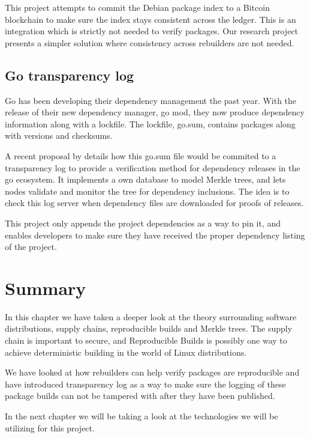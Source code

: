 \documentclass[../Main/thesis.tex]{subfiles}
\begin{document}
This project attempts to commit the Debian package index to a Bitcoin blockchain
to make sure the index stays consistent across the ledger. This is an
integration which is strictly not needed to verify packages. Our research
project presents a simpler solution where consistency across rebuilders are not
needed.

\subsection{Go transparency log}\label{sec:go-transparency-log}
Go has been developing their dependency management the past year. With the
release of their new dependency manager, go mod, they now produce dependency
information along with a lockfile. The lockfile, go.sum, contains packages along
with versions and checksums.

A recent proposal by \citeauthor{russ-cos-and-filippo-valsorda} details how this
go.sum file would be commited to a transparency log to provide a verification
method for dependency releases in the go ecosystem. It implements a own database
to model Merkle trees, and lets nodes validate and monitor the tree for
dependency inclusions. The idea is to check this log server when dependency
files are downloaded for proofs of releases.\cite{russ-cos-and-filippo-valsorda}

This project only appends the project dependencies as a way to pin it, and
enables developers to make sure they have received the proper dependency listing
of the project.


\section*{Summary}\label{sec:summary-theory} 
In this chapter we have taken a deeper look at the theory surrounding software
distributions, supply chains, reproducible builds and Merkle trees. The supply
chain is important to secure, and Reproducible Builds is possibly one way to
achieve deterministic building in the world of Linux distributions.

We have looked at how rebuilders can help verify packages are reproducible and
have introduced transparency log as a way to make sure the logging of these
package builds can not be tampered with after they have been published.

In the next chapter we will be taking a look at the technologies we will be
utilizing for this project.
\end{document}
